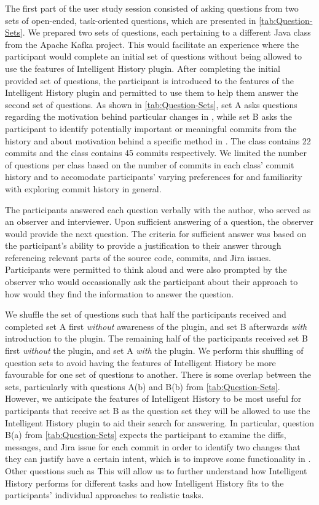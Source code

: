 The first part of the user study session consisted of asking questions from two sets of open-ended, task-oriented questions, which are presented in \autoref{tab:Question-Sets}.
We prepared two sets of questions, each pertaining to a different Java class from the Apache Kafka project.
This would facilitate an experience where the participant would complete an initial set of questions without being allowed to use the features of Intelligent History plugin.
After completing the initial provided set of questions, the participant is introduced to the features of the Intelligent History plugin and permitted to use them to help them answer the second set of questions.
As shown in \autoref{tab:Question-Sets}, set A asks questions regarding the motivation behind particular changes in , while set B asks the participant to identify potentially important or meaningful commits from the history and about motivation behind a specific method in .
The  class contains 22 commits and the  class contains 45 commits respectively.
We limited the number of questions per class based on the number of commits in each class' commit history and to accomodate participants' varying preferences for and familiarity with exploring commit history in general.

The participants answered each question verbally with the author, who served as an observer and interviewer.
Upon sufficient answering of a question, the observer would provide the next question.
The criteria for sufficient answer was based on the participant's ability to provide a justification to their answer through referencing relevant parts of the source code, commits, and Jira issues.
Participants were permitted to think aloud and were also prompted by the observer who would occassionally ask the participant about their approach to how would they find the information to answer the question.

We shuffle the set of questions such that half the participants received and completed set A first \emph{without} awareness of the plugin, and set B afterwards \emph{with} introduction to the plugin.
The remaining half of the participants received set B first \emph{without} the plugin, and set A \emph{with} the plugin.
We perform this shuffling of question sets to avoid having the features of Intelligent History be more favourable for one set of questions to another.
There is some overlap between the sets, particularly with questions A(b) and B(b) from \autoref{tab:Question-Sets}.
However, we anticipate the features of Intelligent History to be most useful for participants that receive set B as the question set they will be allowed to use the Intelligent History plugin to aid their search for answering.
In particular, question B(a) from \autoref{tab:Question-Sets} expects the participant to examine the diffs, messages, and Jira issue for each commit in order to identify two changes that they can justify have a certain intent, which is to improve some functionality in . 
Other questions such as 
This will allow us to further understand how Intelligent History performs for different tasks and how Intelligent History fits to the participants' individual approaches to realistic tasks.

